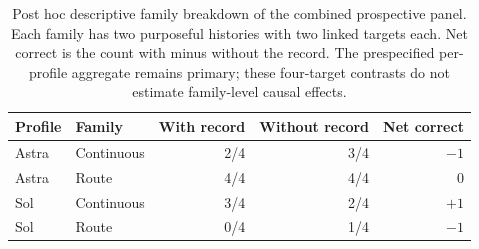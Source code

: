 \begin{table}[htbp]
\centering\small
\begin{tabular}{llrrr}\toprule
Profile & Family & With record & Without record & Net correct\\\midrule
Astra & Continuous & 2/4 & 3/4 & $-1$\\
Astra & Route & 4/4 & 4/4 & $0$\\
Sol & Continuous & 3/4 & 2/4 & $+1$\\
Sol & Route & 0/4 & 1/4 & $-1$\\
\bottomrule\end{tabular}
\caption{Post hoc descriptive family breakdown of the combined prospective
panel. Each family has two purposeful histories with two linked targets each.
Net correct is the count with minus without the record. The prespecified
per-profile aggregate remains primary; these four-target contrasts do not
estimate family-level causal effects.}
\label{tab:prospective-families}
\end{table}
